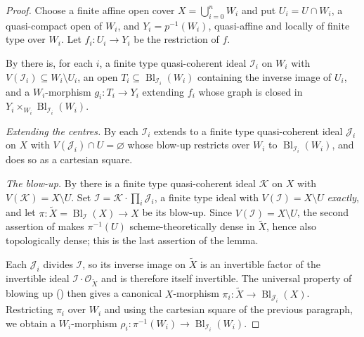 \begin{proof}
  \leanok
  Choose a finite affine open cover $X=\bigcup_{i=0}^nW_i$ and put
  $U_i=U\cap W_i$, a quasi-compact open of $W_i$, and $Y_i=p^{-1}(W_i)$,
  quasi-affine and locally of finite type over $W_i$.  Let
  $f_i\colon U_i\to Y_i$ be the restriction of $f$.

  By  there is, for each
  $i$, a finite type quasi-coherent ideal $\mathcal I_i$ on $W_i$ with
  $V(\mathcal I_i)\subseteq W_i\setminus U_i$, an open
  $T_i\subseteq\operatorname{Bl}_{\mathcal I_i}(W_i)$ containing the inverse
  image of $U_i$, and a $W_i$-morphism $g_i\colon T_i\to Y_i$ extending $f_i$
  whose graph is closed in
  $Y_i\times_{W_i}\operatorname{Bl}_{\mathcal I_i}(W_i)$.

  \emph{Extending the centres.}  By
   each $\mathcal I_i$ extends to a
  finite type quasi-coherent ideal $\mathcal J_i$ on $X$ with
  $V(\mathcal J_i)\cap U=\varnothing$ whose blow-up restricts over $W_i$ to
  $\operatorname{Bl}_{\mathcal I_i}(W_i)$, and does so as a cartesian square.

  \emph{The blow-up.}  By
   there is a finite type
  quasi-coherent ideal $\mathcal K$ on $X$ with $V(\mathcal K)=X\setminus U$.
  Set $\mathcal I=\mathcal K\cdot\prod_i\mathcal J_i$, a finite type ideal with
  $V(\mathcal I)=X\setminus U$ \emph{exactly}, and let
  $\pi\colon\widetilde X=\operatorname{Bl}_{\mathcal I}(X)\to X$ be its
  blow-up.  Since $V(\mathcal I)=X\setminus U$, the second assertion of
   makes $\pi^{-1}(U)$
  scheme-theoretically dense in $\widetilde X$, hence also topologically
  dense; this is the last assertion of the lemma.

  Each $\mathcal J_i$ divides $\mathcal I$, so its inverse image on
  $\widetilde X$ is an invertible factor of the invertible ideal
  $\mathcal I\cdot\mathcal O_{\widetilde X}$ and is therefore itself
  invertible.  The universal property of blowing up
  () then gives a canonical
  $X$-morphism $\pi_i\colon\widetilde X\to\operatorname{Bl}_{\mathcal J_i}(X)$.
  Restricting $\pi_i$ over $W_i$ and using the cartesian square of the
  previous paragraph, we obtain a $W_i$-morphism
  $\rho_i\colon\pi^{-1}(W_i)\to\operatorname{Bl}_{\mathcal I_i}(W_i)$.


\end{proof}
